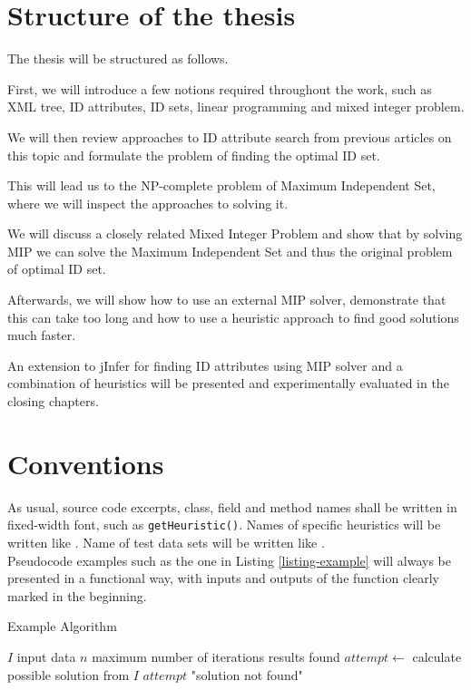 \section{Structure of the thesis}

The thesis will be structured as follows.

First, we will introduce a few notions required throughout the work, such as XML tree, ID attributes, ID sets, linear programming and mixed integer problem. 

We will then review approaches to ID attribute search from previous articles on this topic and formulate the problem of finding the optimal ID set.

This will lead us to the NP-complete problem of Maximum Independent Set, where we will inspect the approaches to solving it.

We will discuss a closely related Mixed Integer Problem and show that by solving MIP we can solve the Maximum Independent Set and thus the original problem of optimal ID set.

Afterwards, we will show how to use an external MIP solver, demonstrate that this can take too long and how to use a heuristic approach to find good solutions much faster.

An extension to jInfer for finding ID attributes using MIP solver and a combination of heuristics will be presented and experimentally evaluated in the closing chapters.

\section{Conventions}

As usual, source code excerpts, class, field and method names shall be written in fixed-width font, such as \texttt{get\-Heu\-ris\-tic()}. Names of specific heuristics will be written like . Name of test data sets will be written like .\\

Pseudocode examples such as the one in Listing \ref{listing-example} will always be presented in a functional way, with inputs and outputs of the function clearly marked in the beginning.

\begin{algorithm}
\caption{Example Algorithm}
\label{listing-example}
\begin{algorithmic}
\REQUIRE $I$ input data
\REQUIRE $n$ maximum number of iterations
\ENSURE results found
  \STATE {}
  \STATE $attempt \gets $ calculate possible solution from $I$
    \RETURN $attempt$
  \ENDIF
  \RETURN "solution not found"
\ENDFOR
\end{algorithmic}
\end{algorithm}

